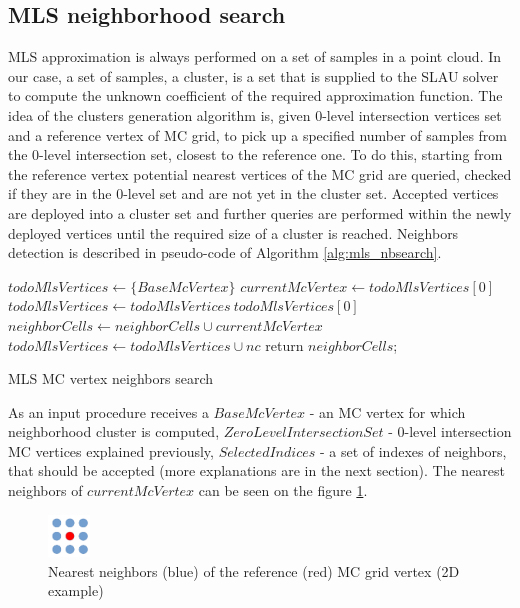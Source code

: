 \subsection{MLS neighborhood search}
MLS approximation is always performed on a set of samples in a point cloud. In our case, a set of samples, a cluster, is a set that is supplied to the SLAU solver to compute the unknown coefficient of the required approximation function. The idea of the clusters generation algorithm is, given 0-level intersection vertices set and a reference vertex of MC grid, to pick up a specified number of samples from the 0-level intersection set, closest to the reference one. To do this, starting from the reference vertex potential nearest vertices of the MC grid are queried, checked if they are in the 0-level set and are not yet in the cluster set. Accepted vertices are deployed into a cluster set and further queries are performed within the newly deployed vertices until the required size of a cluster is reached.
Neighbors detection is described in pseudo-code of Algorithm \ref{alg:mls_nbsearch}.
\begin{algorithm}[H]
	\scriptsize
	\begin{algorithmic}
		\State $todoMlsVertices \gets \{ BaseMcVertex \}$
			\State $currentMcVertex \gets todoMlsVertices[0]$
			\State $todoMlsVertices \gets todoMlsVertices \ todoMlsVertices[0]$
				\State $neighborCells \gets neighborCells \cup currentMcVertex$ 
			\EndIf
					\State $todoMlsVertices \gets todoMlsVertices \cup nc$
				\EndIf
			\EndFor
		\EndWhile
		\State return $neighborCells$;
	\end{algorithmic}
	\caption{MLS MC vertex neighbors search}
	\label{alg:mls_nbsearch}
\end{algorithm}
As an input procedure receives a $BaseMcVertex$ - an MC vertex for which neighborhood cluster is computed, $ZeroLevelIntersectionSet$ - 0-level intersection MC vertices explained previously, $SelectedIndices$ - a set of indexes of neighbors, that should be accepted (more explanations are in the next section). The nearest neighbors of $currentMcVertex$ can be seen on the figure \ref{fig:MCgridNearestNeighbors}.

\begin{figure}[H]
	\begin{center}
		\includegraphics[width=0.1\textwidth]{figures/nearestNeighbors.png}
	\end{center}
	\caption{Nearest neighbors (blue) of the reference (red) MC grid vertex (2D example) } \label{fig:MCgridNearestNeighbors}
\end{figure}

